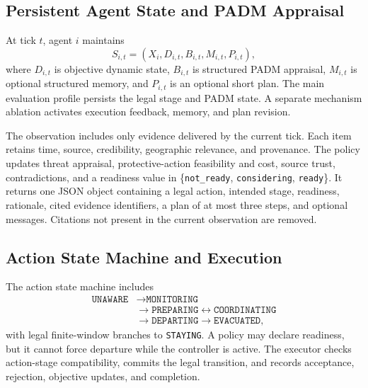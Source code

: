 \documentclass[journal]{IEEEtran}
\begin{document}
\subsection{Persistent Agent State and PADM Appraisal}
At tick $t$, agent $i$ maintains
\begin{equation}
S_{i,t}=(X_i,D_{i,t},B_{i,t},M_{i,t},P_{i,t}),
\end{equation}
where $D_{i,t}$ is objective dynamic state, $B_{i,t}$ is structured PADM
appraisal, $M_{i,t}$ is optional structured memory, and $P_{i,t}$ is an
optional short plan. The main evaluation profile persists the legal stage and
PADM state. A separate mechanism ablation activates execution feedback,
memory, and plan revision.

The observation includes only evidence delivered by the current tick. Each
item retains time, source, credibility, geographic relevance, and provenance.
The policy updates threat appraisal, protective-action feasibility and cost,
source trust, contradictions, and a readiness value in
\{\texttt{not\_ready}, \texttt{considering}, \texttt{ready}\}. It returns one
JSON object containing a legal action, intended stage, readiness, rationale,
cited evidence identifiers, a plan of at most three steps, and optional
messages. Citations not present in the current observation are removed.

\subsection{Action State Machine and Execution}
The action state machine includes
\begin{equation}
\begin{aligned}
\texttt{UNAWARE}&\rightarrow\texttt{MONITORING}\\
&\rightarrow\texttt{PREPARING}
\leftrightarrow\texttt{COORDINATING}\\
&\rightarrow\texttt{DEPARTING}
\rightarrow\texttt{EVACUATED},
\end{aligned}
\end{equation}
with legal finite-window branches to \texttt{STAYING}. A policy may declare
readiness, but it cannot force departure while the controller is active. The
executor checks action-stage compatibility, commits the legal transition, and
records acceptance, rejection, objective updates, and completion.
\end{document}
